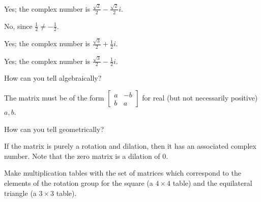\documentclass[../key.tex]{subfiles}
\begin{document}
Yes; the complex number is $\frac{\sqrt{2}}{2} - \frac{\sqrt{2}}{2}i$.

\begin{iinner_problem}
\item {}
\end{iinner_problem}

No, since $\frac{1}{2} \neq -\frac{1}{2}$.

\begin{iinner_problem}
\item {}
\end{iinner_problem}

Yes; the complex number is $\frac{\sqrt{3}}{2} + \frac{1}{2}i$.

\begin{iinner_problem}
\item {}
\end{iinner_problem}

Yes; the complex number is $\frac{\sqrt{3}}{2} - \frac{1}{2}i$.

\begin{inner_problem}
\item How can you tell algebraically?
\end{inner_problem}

The matrix must be of the form $\begin{bmatrix} a & -b \\ b & a \end{bmatrix}$ for real (but not necessarily positive) $a,b$.

\begin{inner_problem}
\item How can you tell geometrically?
\end{inner_problem}

If the matrix is purely a rotation and dilation, then it has an associated complex number. Note that the zero matrix is a dilation of $0$.

\begin{outer_problem}
\item Make multiplication tables with the set of matrices which correspond to the elements of the rotation group for the square (a $4\times 4$ table) and the equilateral triangle (a $3\times 3$ table).
\end{outer_problem}
\end{document}
